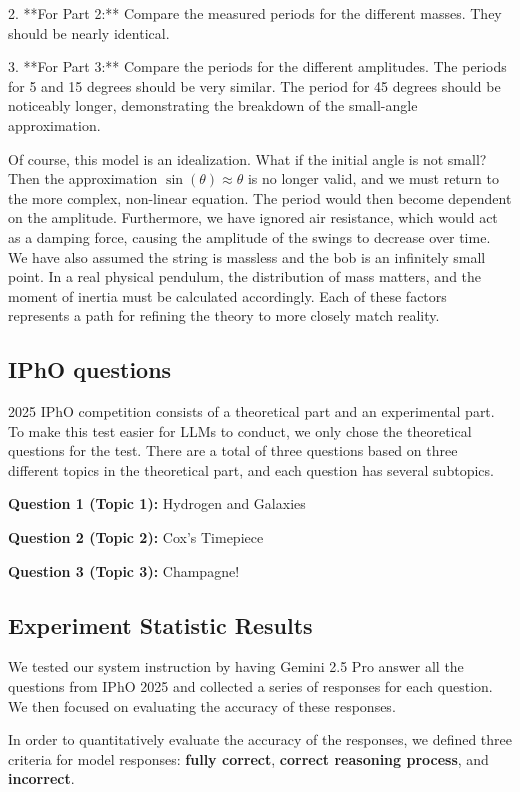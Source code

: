 \documentclass[12pt]{article}
\begin{document}
2.  **For Part 2:** Compare the measured periods for the different masses. They should be nearly identical.

3.  **For Part 3:** Compare the periods for the different amplitudes. The periods for 5 and 15 degrees should be very similar. The period for 45 degrees should be noticeably longer, demonstrating the breakdown of the small-angle approximation.
\par
\bigskip

Of course, this model is an idealization. What if the initial angle is not small? Then the approximation \(\sin(\theta) \approx \theta\) is no longer valid, and we must return to the more complex, non-linear equation. The period would then become dependent on the amplitude. Furthermore, we have ignored air resistance, which would act as a damping force, causing the amplitude of the swings to decrease over time. We have also assumed the string is massless and the bob is an infinitely small point. In a real physical pendulum, the distribution of mass matters, and the moment of inertia must be calculated accordingly. Each of these factors represents a path for refining the theory to more closely match reality.

\subsection{IPhO questions}
2025 IPhO competition consists of a theoretical part and an experimental part. To make this test easier for LLMs to conduct, we only chose the theoretical questions for the test. There are a total of three questions based on three different topics in the theoretical part, and each question has several subtopics. 
\par
\bigskip
\textbf{Question 1 (Topic 1):}
Hydrogen and Galaxies
\par
\bigskip
\textbf{Question 2 (Topic 2):}
Cox's Timepiece
\par
\bigskip
\textbf{Question 3 (Topic 3):}
Champagne!



\subsection{Experiment Statistic Results}
We tested our system instruction by having Gemini 2.5 Pro answer all the questions from IPhO 2025 and collected a series of responses for each question. We then focused on evaluating the accuracy of these responses.

In order to quantitatively evaluate the accuracy of the responses, we defined three criteria for model responses: \textbf{fully correct}, \textbf{correct reasoning process}, and \textbf{incorrect}.
\end{document}

